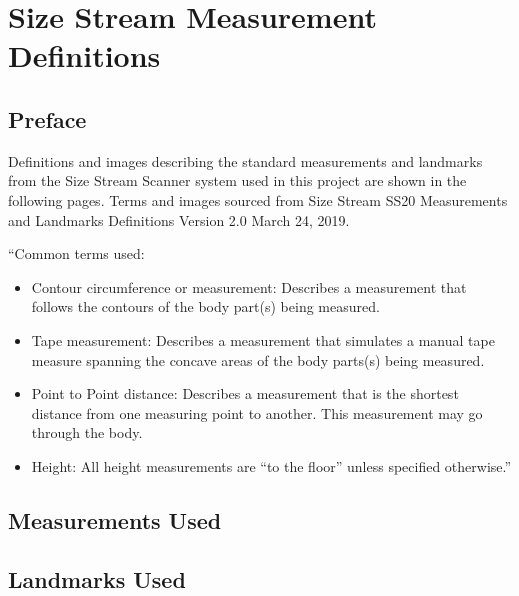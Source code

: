 \chapter{Size Stream Measurement Definitions}
\section{Preface}

Definitions and images describing the standard measurements and landmarks from the Size Stream Scanner system used in this project are shown in the following pages. Terms and images sourced from Size Stream SS20 Measurements and Landmarks Definitions Version 2.0 March 24, 2019.

``Common terms used:

\begin{itemize}
    \item Contour circumference or measurement: Describes a measurement that follows the contours of the body part(s) being measured.
    \item Tape measurement: Describes a measurement that simulates a manual tape measure spanning the concave areas of the body parts(s) being measured.
    \item Point to Point distance: Describes a measurement that is the shortest distance from one measuring point to another. This measurement may go through the body.
    \item Height: All height measurements are “to the floor” unless specified otherwise.''
\end{itemize}

\section{Measurements Used}

\section{Landmarks Used}

